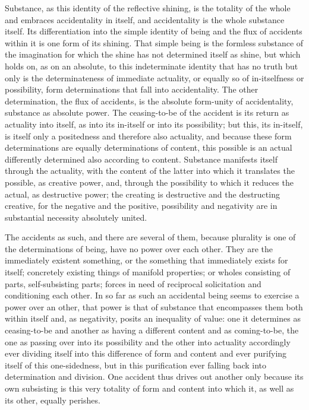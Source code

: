 Substance, as this identity of the reflective shining,
is the totality of the whole and embraces accidentality in itself,
and accidentality is the whole substance itself.
Its differentiation into the simple identity
of being and the flux of accidents
within it is one form of its shining.
That simple being is the formless substance of the imagination
for which the shine has not determined itself as shine,
but which holds on, as on an absolute,
to this indeterminate identity that has no truth
but only is the determinateness of immediate actuality,
or equally so of in-itselfness or possibility,
form determinations that fall into accidentality.
The other determination, the flux of accidents,
is the absolute form-unity of accidentality,
substance as absolute power.
The ceasing-to-be of the accident is
its return as actuality into itself,
as into its in-itself or into its possibility;
but this, its in-itself, is itself only a positedness
and therefore also actuality,
and because these form determinations are
equally determinations of content,
this possible is an actual differently determined
also according to content.
Substance manifests itself through the actuality,
with the content of the latter into which
it translates the possible, as creative power,
and, through the possibility to which
it reduces the actual, as destructive power;
the creating is destructive and the destructing creative,
for the negative and the positive, possibility and negativity
are in substantial necessity absolutely united.

The accidents as such, and there are several of them,
because plurality is one of the determinations of being,
have no power over each other.
They are the immediately existent something,
or the something that immediately exists for itself;
concretely existing things of manifold properties;
or wholes consisting of parts, self-subsisting parts;
forces in need of reciprocal solicitation
and conditioning each other.
In so far as such an accidental
being seems to exercise a power over an other,
that power is that of substance that
encompasses them both within itself
and, as negativity, posits an inequality of value:
one it determines as ceasing-to-be
and another as having a different content
and as coming-to-be,
the one as passing over into its possibility
and the other into actuality
accordingly ever dividing itself
into this difference of form and content
and ever purifying itself of this one-sidedness,
but in this purification ever falling back
into determination and division.
One accident thus drives out another
only because its own subsisting is
this very totality of form and content
into which it, as well as its other, equally perishes.


